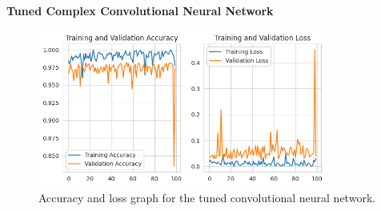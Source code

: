 \textbf{Tuned Complex Convolutional Neural Network}

\begin{figure}[ht]
    \centering
    \includegraphics[width=0.85\textwidth]{./img/cnn/tuned/accuracy-loss-graph}
    \caption{Accuracy and loss graph for the tuned convolutional neural network.}
    \label{fig:cnn-tuned-accuracy-loss-graph}
\end{figure}

